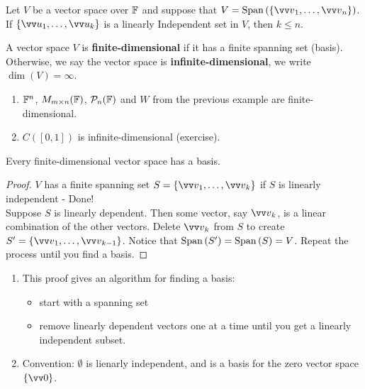 \begin{lemma}
    Let $V$ be a vector space over ${\mathbb{F}}$ and suppose that $V = \spn{(\left\{\vvv_1, \ldots, \vvv_n\right\})}$.
    If $\left\{\vvu_1, \ldots, \vvu_k\right\}$ is a linearly Independent set in $V$, then $k \leq n$.
\end{lemma}

\begin{definition}
    A vector space $V$ is \textbf{finite-dimensional} if it has a finite spanning set (basis). Otherwise, we say
    the vector space is \textbf{infinite-dimensional}, we write $\dim{(V)} = \infty$.
\end{definition}

\begin{example}
    \phantom{}
    \begin{enumerate}
        \item ${\mathbb{F}}^n$, $M_{m \times n}({\mathbb{F}})$, $\mathcal{P}_n({\mathbb{F}})$ and $W$ from the previous example are finite-dimensional.
        \item $C([0,1])$ is infinite-dimensional (exercise).
    \end{enumerate}
\end{example}

\begin{theorem}
    Every finite-dimensional vector space has a basis.
\end{theorem}

\begin{proof}
    $V$ has a finite spanning set $S = \left\{  \vvv_1, \ldots, \vvv_k \right\}$ if $S$ is linearly independent - Done! \\
    Suppose $S$ is linearly dependent. Then some vector, say $\vvv_k$, is a linear combination of the other vectors.
    Delete $\vvv_k$ from $S$ to create $S^\prime = \left\{  \vvv_1, \ldots, \vvv_{k-1} \right\}$. Notice that
    $\operatorname{Span}{(S^\prime)} = \operatorname{Span}{(S)} = V$. Repeat the process until you find a basis.
\end{proof}

\begin{remark}
    \phantom{}
    \begin{enumerate}
        \item This proof gives an algorithm for finding a basis:
        \begin{itemize}
            \item start with a spanning set
            \item remove linearly dependent vectors one at a time until you get a linearly independent subset.
        \end{itemize}
        \item Convention: $\emptyset$ is lienarly independent, and is a basis for the zero vector space $\{\vzero\}$.\\
    \end{enumerate}
\end{remark}

